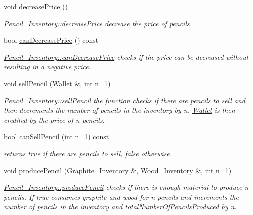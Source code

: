 \begin{DoxyCompactItemize}
void \hyperlink{classPencil__Inventory_a711d64e733cd5b67ea3aeb0ccdda0870}{decrease\+Price} ()
\begin{DoxyCompactList}\small\item\em \hyperlink{classPencil__Inventory_a711d64e733cd5b67ea3aeb0ccdda0870}{Pencil\+\_\+\+Inventory\+::decrease\+Price} decrease the price of pencils. \end{DoxyCompactList}\item 
bool \hyperlink{classPencil__Inventory_a5c8d580bd32a2ef4b2196da7570203bf}{can\+Decrease\+Price} () const
\begin{DoxyCompactList}\small\item\em \hyperlink{classPencil__Inventory_a5c8d580bd32a2ef4b2196da7570203bf}{Pencil\+\_\+\+Inventory\+::can\+Decrease\+Price} checks if the price can be decreased without resulting in a negative price. \end{DoxyCompactList}\item 
void \hyperlink{classPencil__Inventory_a1ed4fd3f13785ba2a93c9f4045a5cbc7}{sell\+Pencil} (\hyperlink{classWallet}{Wallet} \&, int n=1)
\begin{DoxyCompactList}\small\item\em \hyperlink{classPencil__Inventory_a1ed4fd3f13785ba2a93c9f4045a5cbc7}{Pencil\+\_\+\+Inventory\+::sell\+Pencil} the function checks if there are pencils to sell and then decrements the number of pencils in the inventory by n. \hyperlink{classWallet}{Wallet} is then credited by the price of n pencils. \end{DoxyCompactList}\item 
bool \hyperlink{classPencil__Inventory_ab8c12609e21dfd98269e6d4589b13a1c}{can\+Sell\+Pencil} (int n=1) const
\begin{DoxyCompactList}\small\item\em returns true if there are pencils to sell, false otherwise \end{DoxyCompactList}\item 
void \hyperlink{classPencil__Inventory_a9cfd91ef9a8335d1b6448e78137cf3bd}{produce\+Pencil} (\hyperlink{classGraphite__Inventory}{Graphite\+\_\+\+Inventory} \&, \hyperlink{classWood__Inventory}{Wood\+\_\+\+Inventory} \&, int n=1)
\begin{DoxyCompactList}\small\item\em \hyperlink{classPencil__Inventory_a9cfd91ef9a8335d1b6448e78137cf3bd}{Pencil\+\_\+\+Inventory\+::produce\+Pencil} checks if there is enough material to produce n pencils. If true consumes graphite and wood for n pencils and increments the number of pencils in the inventory and total\+Number\+Of\+Pencils\+Produced by n. \end{DoxyCompactList}\item 

\end{DoxyCompactItemize}
